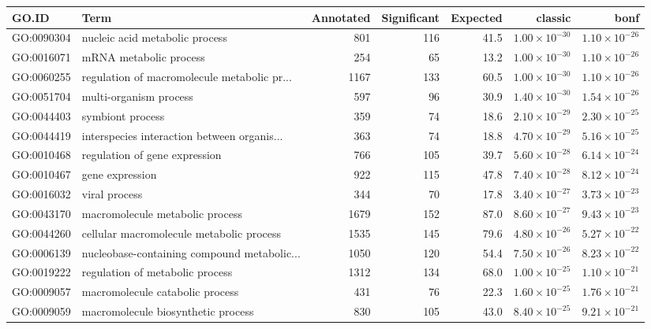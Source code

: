 \begin{table}[ht]
\centering
\begin{tabular}{llrrrrr}
  \hline
GO.ID & Term & Annotated & Significant & Expected & classic & bonf \\ 
  \hline
GO:0090304 & nucleic acid metabolic process & 801 & 116 & 41.5 & $1.00 \times 10^{-30}$ & $1.10 \times 10^{-26}$ \\ 
  GO:0016071 & mRNA metabolic process & 254 & 65 & 13.2 & $1.00 \times 10^{-30}$ & $1.10 \times 10^{-26}$ \\ 
  GO:0060255 & regulation of macromolecule metabolic pr... & 1167 & 133 & 60.5 & $1.00 \times 10^{-30}$ & $1.10 \times 10^{-26}$ \\ 
  GO:0051704 & multi-organism process & 597 & 96 & 30.9 & $1.40 \times 10^{-30}$ & $1.54 \times 10^{-26}$ \\ 
  GO:0044403 & symbiont process & 359 & 74 & 18.6 & $2.10 \times 10^{-29}$ & $2.30 \times 10^{-25}$ \\ 
  GO:0044419 & interspecies interaction between organis... & 363 & 74 & 18.8 & $4.70 \times 10^{-29}$ & $5.16 \times 10^{-25}$ \\ 
  GO:0010468 & regulation of gene expression & 766 & 105 & 39.7 & $5.60 \times 10^{-28}$ & $6.14 \times 10^{-24}$ \\ 
  GO:0010467 & gene expression & 922 & 115 & 47.8 & $7.40 \times 10^{-28}$ & $8.12 \times 10^{-24}$ \\ 
  GO:0016032 & viral process & 344 & 70 & 17.8 & $3.40 \times 10^{-27}$ & $3.73 \times 10^{-23}$ \\ 
  GO:0043170 & macromolecule metabolic process & 1679 & 152 & 87.0 & $8.60 \times 10^{-27}$ & $9.43 \times 10^{-23}$ \\ 
  GO:0044260 & cellular macromolecule metabolic process & 1535 & 145 & 79.6 & $4.80 \times 10^{-26}$ & $5.27 \times 10^{-22}$ \\ 
  GO:0006139 & nucleobase-containing compound metabolic... & 1050 & 120 & 54.4 & $7.50 \times 10^{-26}$ & $8.23 \times 10^{-22}$ \\ 
  GO:0019222 & regulation of metabolic process & 1312 & 134 & 68.0 & $1.00 \times 10^{-25}$ & $1.10 \times 10^{-21}$ \\ 
  GO:0009057 & macromolecule catabolic process & 431 & 76 & 22.3 & $1.60 \times 10^{-25}$ & $1.76 \times 10^{-21}$ \\ 
  GO:0009059 & macromolecule biosynthetic process & 830 & 105 & 43.0 & $8.40 \times 10^{-25}$ & $9.21 \times 10^{-21}$ \\ 

\end{tabular}
\end{table}

